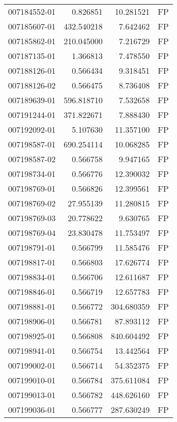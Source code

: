 \begin{tabular}{lrrl}
007184552-01 &    0.826851 &      10.281521 &   FP \\
007185607-01 &  432.540218 &       7.642462 &   FP \\
007185862-01 &  210.045000 &       7.216729 &   FP \\
007187135-01 &    1.366813 &       7.478550 &   FP \\
007188126-01 &    0.566434 &       9.318451 &   FP \\
007188126-02 &    0.566475 &       8.736408 &   FP \\
007189639-01 &  596.818710 &       7.532658 &   FP \\
007191244-01 &  371.822671 &       7.888430 &   FP \\
007192092-01 &    5.107630 &      11.357100 &   FP \\
007198587-01 &  690.254114 &      10.068285 &   FP \\
007198587-02 &    0.566758 &       9.947165 &   FP \\
007198734-01 &    0.566776 &      12.390032 &   FP \\
007198769-01 &    0.566826 &      12.399561 &   FP \\
007198769-02 &   27.955139 &      11.280815 &   FP \\
007198769-03 &   20.778622 &       9.630765 &   FP \\
007198769-04 &   23.830478 &      11.753497 &   FP \\
007198791-01 &    0.566799 &      11.585476 &   FP \\
007198817-01 &    0.566803 &      17.626774 &   FP \\
007198834-01 &    0.566706 &      12.611687 &   FP \\
007198846-01 &    0.566719 &      12.657783 &   FP \\
007198881-01 &    0.566772 &     304.680359 &   FP \\
007198906-01 &    0.566781 &      87.893112 &   FP \\
007198925-01 &    0.566808 &     840.604492 &   FP \\
007198941-01 &    0.566754 &      13.442564 &   FP \\
007199002-01 &    0.566714 &      54.352375 &   FP \\
007199010-01 &    0.566784 &     375.611084 &   FP \\
007199013-01 &    0.566782 &     448.626160 &   FP \\
007199036-01 &    0.566777 &     287.630249 &   FP \\

\end{tabular}
